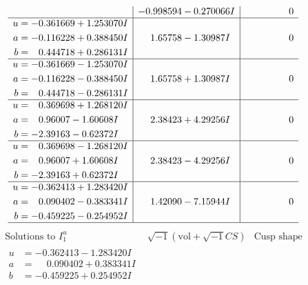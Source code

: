 \documentclass[1p]{elsarticle_modified}
\theoremstyle{definition}
\newcommand{\I}{\sqrt{-1}}
\begin{document}
$$\begin{array}{c|c|c}
 & -0.998594 - 0.270066 I & \phantom{-0.000000 } 0 \\ \hline\begin{aligned}
u &= -0.361669 + 1.253070 I \\
a &= -0.116228 + 0.388450 I \\
b &= \phantom{-}0.444718 + 0.286131 I\end{aligned}
 & \phantom{-}1.65758 - 1.30987 I & \phantom{-0.000000 } 0 \\ \hline\begin{aligned}
u &= -0.361669 - 1.253070 I \\
a &= -0.116228 - 0.388450 I \\
b &= \phantom{-}0.444718 - 0.286131 I\end{aligned}
 & \phantom{-}1.65758 + 1.30987 I & \phantom{-0.000000 } 0 \\ \hline\begin{aligned}
u &= \phantom{-}0.369698 + 1.268120 I \\
a &= \phantom{-}0.96007 - 1.60608 I \\
b &= -2.39163 - 0.62372 I\end{aligned}
 & \phantom{-}2.38423 + 4.29256 I & \phantom{-0.000000 } 0 \\ \hline\begin{aligned}
u &= \phantom{-}0.369698 - 1.268120 I \\
a &= \phantom{-}0.96007 + 1.60608 I \\
b &= -2.39163 + 0.62372 I\end{aligned}
 & \phantom{-}2.38423 - 4.29256 I & \phantom{-0.000000 } 0 \\ \hline\begin{aligned}
u &= -0.362413 + 1.283420 I \\
a &= \phantom{-}0.090402 - 0.383341 I \\
b &= -0.459225 - 0.254952 I\end{aligned}
 & \phantom{-}1.42090 - 7.15944 I & \phantom{-0.000000 } 0\\
 \hline 
 \end{array}$$\newpage$$\begin{array}{c|c|c}  
\text{Solutions to }I^u_{1}& \I (\text{vol} + \sqrt{-1}CS) & \text{Cusp shape}\\
 \hline 
\begin{aligned}
u &= -0.362413 - 1.283420 I \\
a &= \phantom{-}0.090402 + 0.383341 I \\
b &= -0.459225 + 0.254952 I\end{aligned}

\end{array}$$
\end{document}
